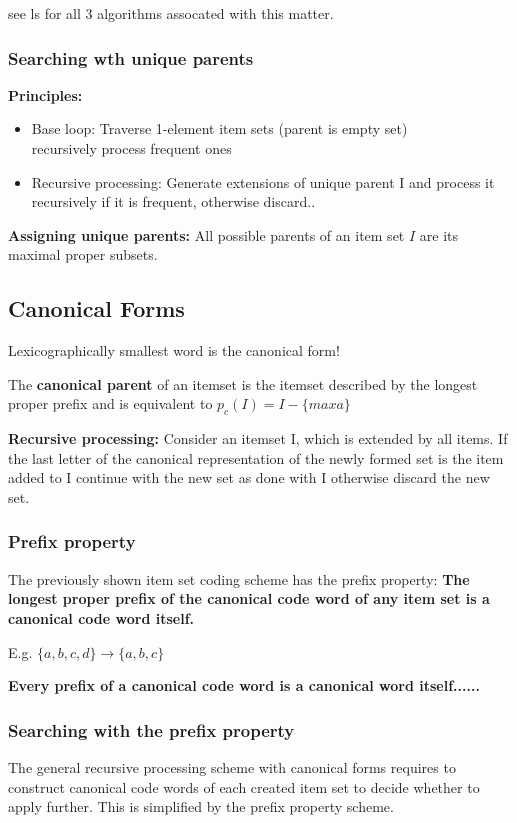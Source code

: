 \documentclass[fleqn, oneside, 10pt, titlepage]{article}
\begin{document}
see ls for all 3 algorithms assocated with this matter.

\subsubsection{Searching wth unique parents}
\textbf{Principles:}
\begin{itemize}
	\item Base loop: Traverse 1-element item sets (parent is empty set) \\
		  recursively process frequent ones
	\item Recursive processing: Generate extensions of unique parent I and process it recursively if it is frequent, otherwise discard..
\end{itemize}

\textbf{Assigning unique parents:}
All possible parents of an item set $I$ are its maximal proper subsets.

\subsection{Canonical Forms}
Lexicographically smallest word is the canonical form!

The \textbf{canonical parent} of an itemset is the itemset described by the longest proper prefix and is equivalent to $p_c(I) = I - \{max a\}$

\textbf{Recursive processing:}
Consider an itemset I, which is extended by all items. If the last letter of the canonical representation of the newly formed set is the item added to I continue with the new set as done with I otherwise discard the new set.

\subsubsection{Prefix property}
The previously shown item set coding scheme has the prefix property: \textbf{The longest proper prefix of the canonical code word of any item set is a canonical code word itself.}

E.g. $\{a,b,c,d\} \rightarrow \{a,b,c\}$

\textbf{Every prefix of a canonical code word is a canonical word itself......}

\subsubsection{Searching with the prefix property}
The general recursive processing scheme with canonical forms requires to construct canonical code words of each created item set to decide whether to apply further. This is simplified by the prefix property scheme.
\end{document}
